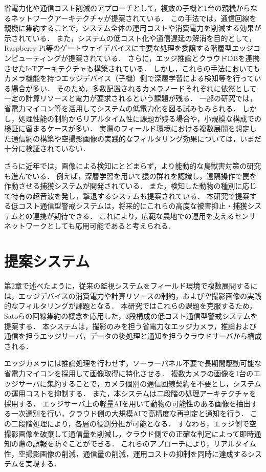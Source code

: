 \documentclass[technicalreport]{ieicej}
\begin{document}
省電力化や通信コスト削減のアプローチとして，複数の子機と1台の親機からなるネットワークアーキテクチャが提案されている\cite{Sato2022}．
この手法では，通信回線を親機に集約することで，システム全体の運用コストや消費電力を削減する効果が示されている．
また，システムの低コスト化や通信遅延の解消を目的として，Raspberry Pi等のゲートウェイデバイスに主要な処理を委譲する階層型エッジコンピューティングが提案されている\cite{8912138}．
さらに，エッジ推論とクラウドDBを連携させたIoTアーキテクチャも構築されている\cite{9345858}．
しかし，これらの手法においてもカメラ機能を持つエッジデバイス（子機）側で深層学習による検知等を行っている場合が多い．
そのため，多数配置されるカメラノードそれぞれに依然として一定の計算リソースと電力が要求されるという課題が残る．
一部の研究では，省電力マイコン等を活用してシステムの低電力化を図る試みもみられる\cite{IEICE2020}．
しかし，処理性能の制約からリアルタイム性に課題が残る場合や，小規模な構成での検証に留まるケースが多い．
実際のフィールド環境における複数展開を想定した通信網の構築や空撮影画像の実践的なフィルタリング効果については，いまだ十分に検証されていない．

さらに近年では，画像による検知にとどまらず，より能動的な鳥獣害対策の研究も進んでいる．
例えば，深層学習を用いて猿の群れを認識し，遠隔操作で罠を作動させる捕獲システムが開発されている\cite{8716170}．
また，検知した動物の種別に応じて特有の超音波を発し，撃退するシステムも提案されている\cite{11324419}．
本研究で提案する低コスト通信型警戒システムは，将来的にこれらの高度な被害抑止・捕獲システムとの連携が期待できる．
これにより，広範な農地での運用を支えるセンサネットワークとしても応用可能であると考えられる．

\section{提案システム}
第2章で述べたように，従来の監視システムをフィールド環境で複数展開するには，エッジデバイスの消費電力や計算リソースの制約，および空撮影画像の実践的なフィルタリングが課題となる．
本研究ではこれらの課題を克服するため，Satoら\cite{Sato2022}の回線集約の概念を応用した，3段構成の低コスト通信型警戒システムを提案する．
本システムは，撮影のみを担う省電力なエッジカメラ，推論および通信を担うエッジサーバ，データの後処理と通知を担うクラウドサーバから構成される．

エッジカメラには推論処理を行わせず，ソーラーパネル不要で長期間駆動可能な省電力マイコンを採用して画像取得に特化させる．
複数カメラの画像を1台のエッジサーバに集約することで，カメラ個別の通信回線契約を不要とし，システムの運用コストを抑制する．
また，本システムは二段階の処理アーキテクチャを採用する．
エッジサーバ上の軽量AIを用いて動物の可能性のある画像を抽出する一次選別を行い，クラウド側の大規模AIで高精度な再判定と通知を行う．
この二段階処理により，各層の役割分担が可能となる．
すなわち，エッジ側で空撮影画像を破棄して通信量を削減し，クラウド側での正確な判定によって即時通知の際の誤報を防ぐことができる．
これらのアプローチにより，リアルタイム性，空撮影画像の削減，通信量の削減，運用コストの抑制を同時に達成するシステムを実現する．
\end{document}
